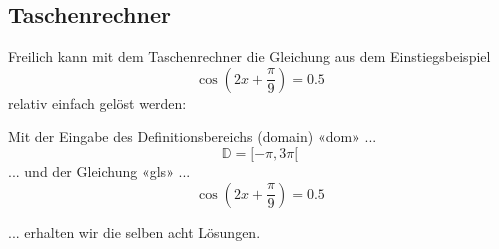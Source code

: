 \subsection{Taschenrechner}
Freilich kann mit dem Taschenrechner die Gleichung aus dem
Einstiegsbeispiel $$\cos(2x+\frac{\pi}{9})=0.5$$ relativ einfach gelöst werden:

Mit der Eingabe des Definitionsbereichs (domain) «dom» ...
$$\mathbb{D} =  [ -\pi, 3\pi[$$
... und der Gleichung «gls» ...
$$\cos\left(2x+\frac{\pi}{9}\right) = 0.5$$

... erhalten wir die selben acht Lösungen.
    

    
\newpage
